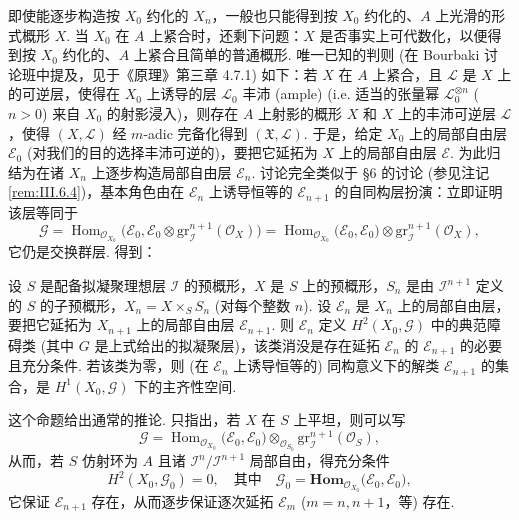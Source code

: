 即使能逐步构造按 $X_0$ 约化的 $X_n$，一般也只能得到按 $X_0$ 约化的、$A$ 上光滑的形式概形 $X$. 当 $X_0$ 在 $A$ 上紧合时，还剩下问题：$X$ 是否事实上可代数化，以便得到按 $X_0$ 约化的、$A$ 上紧合且简单的普通概形. 唯一已知的判则 (在 Bourbaki 讨论班中提及，见于《原理》第三章 4.7.1) 如下：若 $X$ 在 $A$ 上紧合，且 $\mathcal{L}$ 是 $X$ 上的可逆层，使得在 $X_0$ 上诱导的层 $\mathcal{L}_0$ 丰沛 (ample) (i.e. 适当的张量幂 $\mathcal{L}_0^{\otimes n}$ ($n > 0$) 来自 $X_0$ 的射影浸入)，则存在 $A$ 上射影的概形 $X$ 和 $X$ 上的丰沛可逆层 $\mathcal{L}$，使得 $(X, \mathcal{L})$ 经 $m$-adic 完备化得到 $(\mathfrak{X}, \mathcal{L})$. 于是，给定 $X_0$ 上的局部自由层 $\mathcal{E}_0$ (对我们的目的选择丰沛可逆的)，要把它延拓为 $X$ 上的局部自由层 $\mathcal{E}$. 为此归结为在诸 $X_n$ 上逐步构造局部自由层 $\mathcal{E}_n$. 讨论完全类似于 §6 的讨论 (参见注记 \ref{rem:III.6.4})，基本角色由在 $\mathcal{E}_n$ 上诱导恒等的 $\mathcal{E}_{n+1}$ 的自同构层扮演：立即证明该层等同于
\begin{equation}
\mathcal{G} = \operatorname{Hom}_{\mathcal{O}_{X_0}}\bigl(\mathcal{E}_0, \mathcal{E}_0 \otimes \mathrm{gr}_{\mathcal{I}}^{n+1}(\mathcal{O}_X)\bigr) = \operatorname{Hom}_{\mathcal{O}_{X_0}}\bigl(\mathcal{E}_0, \mathcal{E}_0\bigr) \otimes \mathrm{gr}_{\mathcal{I}}^{n+1}(\mathcal{O}_X), \tag{($*$)}
\end{equation}
它仍是交换群层. 得到：

\begin{proposition}\label{prop:III.7.1}
设 $S$ 是配备拟凝聚理想层 $\mathcal{I}$ 的预概形，$X$ 是 $S$ 上的预概形，$S_n$ 是由 $\mathcal{I}^{n+1}$ 定义的 $S$ 的子预概形，$X_n = X \times_S S_n$ (对每个整数 $n$). 设 $\mathcal{E}_n$ 是 $X_n$ 上的局部自由层，要把它延拓为 $X_{n+1}$ 上的局部自由层 $\mathcal{E}_{n+1}$. 则 $\mathcal{E}_n$ 定义 $H^2(X_0, \mathcal{G})$ 中的典范障碍类 (其中 $G$ 是上式给出的拟凝聚层)，该类消没是存在延拓 $\mathcal{E}_n$ 的 $\mathcal{E}_{n+1}$ 的必要且充分条件. 若该类为零，则 (在 $\mathcal{E}_n$ 上诱导恒等的) 同构意义下的解类 $\mathcal{E}_{n+1}$ 的集合，是 $H^1(X_0, \mathcal{G})$ 下的主齐性空间.
\end{proposition}

这个命题给出通常的推论. 只指出，若 $X$ 在 $S$ 上平坦，则可以写
\[
\mathcal{G} = \operatorname{Hom}_{\mathcal{O}_{X_0}}\bigl(\mathcal{E}_0, \mathcal{E}_0\bigr) \otimes_{\mathcal{O}_{S_0}} \mathrm{gr}_{\mathcal{I}}^{n+1}(\mathcal{O}_S),
\]
从而，若 $S$ 仿射环为 $A$ 且诸 $\mathcal{I}^n/\mathcal{I}^{n+1}$ 局部自由，得充分条件
\[
H^2(X_0, \mathcal{G}_0) = 0, \quad \text{其中} \quad \mathcal{G}_0 = \mathbf{Hom}_{\mathcal{O}_{X_0}}\bigl(\mathcal{E}_0, \mathcal{E}_0\bigr),
\]
它保证 $\mathcal{E}_{n+1}$ 存在，从而逐步保证逐次延拓 $\mathcal{E}_m$ ($m = n, n+1$，等) 存在.

